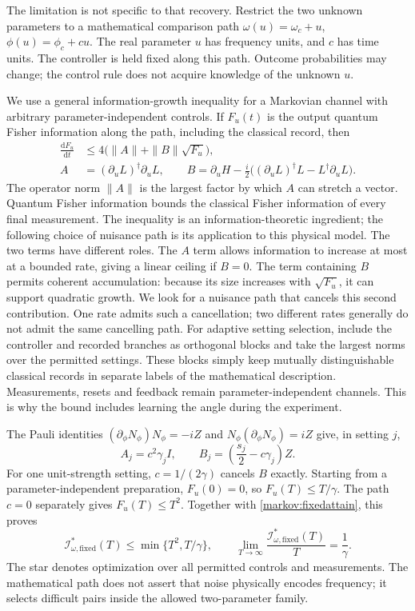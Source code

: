 \documentclass[11pt,a4paper]{article}
\numberwithin{equation}{section}
\theoremstyle{remark}
\begin{document}
The limitation is not specific to that recovery. Restrict the two unknown
parameters to a mathematical comparison path
$\omega(u)=\omega_c+u$, $\phi(u)=\phi_c+cu$. The real parameter $u$
has frequency units, and $c$ has time units. The controller is held fixed along
this path. Outcome probabilities may change; the control rule does not acquire
knowledge of the unknown $u$.

We use a general information-growth inequality for a Markovian channel with
arbitrary parameter-independent controls. If $F_u(t)$ is the output quantum
Fisher information along the path, including the classical record, then
\begin{align}
 \frac{\mathrm dF_u}{\mathrm dt}
 &\le 4\bigl(\|A\|+\|B\|\sqrt{F_u}\bigr),\label{markov:growth}\\
 A&=(\partial_uL)^\dagger\partial_uL,\qquad
 B=\partial_uH-\frac{i}{2}
 \bigl((\partial_uL)^\dagger L-L^\dagger\partial_uL\bigr).
 \nonumber
\end{align}
The operator norm $\|A\|$ is the largest factor by which $A$ can stretch
a vector. Quantum Fisher
information bounds the classical Fisher information of every final
measurement. The inequality is an information-theoretic ingredient; the
following choice of nuisance path is its application to this physical model.
The two terms have different roles. The $A$ term allows information to
increase at most at a bounded rate, giving a linear ceiling if $B=0$.
The term containing $B$ permits
coherent accumulation: because its size increases with $\sqrt{F_u}$, it can
support quadratic growth. We look for a nuisance path that cancels this
second contribution. One rate admits such a cancellation; two different
rates generally do not admit the same cancelling path.
For adaptive setting selection, include the controller and recorded branches
as orthogonal blocks and take the largest norms over the permitted settings.
These blocks simply keep mutually distinguishable classical records in
separate labels of the mathematical description.
Measurements, resets and feedback remain parameter-independent channels. This
is why the bound includes learning the angle during the experiment.

The Pauli identities
$(\partial_\phi N_\phi)N_\phi=-iZ$ and
$N_\phi(\partial_\phi N_\phi)=iZ$ give, in setting $j$,
\begin{equation}
 A_j=c^2\gamma_j I,\qquad
 B_j=\left(\frac{s_j}{2}-c\gamma_j\right)Z.
 \label{markov:ab}
\end{equation}
For one unit-strength setting, $c=1/(2\gamma)$ cancels $B$ exactly.
Starting from a parameter-independent preparation, $F_u(0)=0$, so
$F_u(T)\le T/\gamma$. The path $c=0$ separately gives $F_u(T)\le T^2$.
Together with \eqref{markov:fixedattain}, this proves
\begin{equation}
 \mathcal I^*_{\omega,\mathrm{fixed}}(T)\le\min\{T^2,T/\gamma\},
 \qquad
 \lim_{T\to\infty}\frac{\mathcal I^*_{\omega,\mathrm{fixed}}(T)}{T}
 =\frac1\gamma.
 \label{markov:fixedlocal}
\end{equation}
The star denotes optimization over all permitted controls and measurements.
The mathematical path does not assert that noise physically encodes frequency;
it selects difficult pairs inside the allowed two-parameter family.
\end{document}
